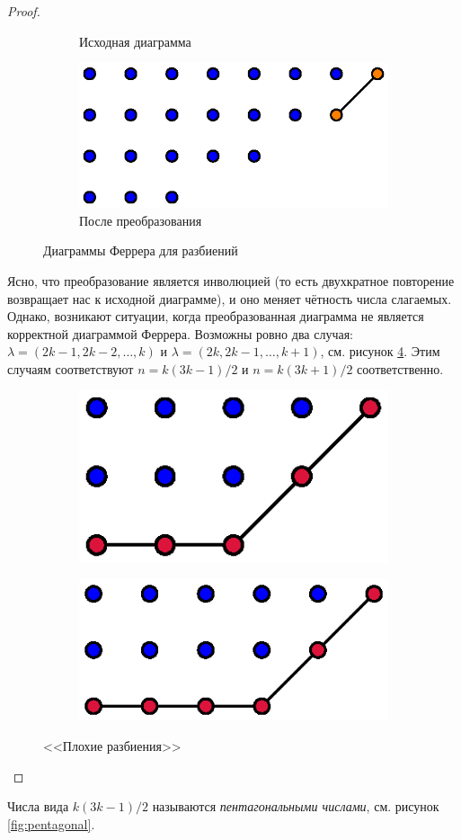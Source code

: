 \documentclass[a5paper]{article}
\theoremstyle{definition}
\begin{document}
\begin{proof}
\begin{figure}[h]
\begin{subfigure}{.33\textwidth}
	\caption{Исходная диаграмма}
	\label{fig:ferrer_2}	
\end{subfigure}
\begin{subfigure}{.33\textwidth}
	\centering
	\includegraphics[width=.8\textwidth]{ferrer_3}
	\caption{После преобразования}
	\label{fig:ferrer_3}	
\end{subfigure}
\caption{Диаграммы Феррера для разбиений}
\end{figure}
Ясно, что преобразование является инволюцией (то есть двухкратное 
повторение возвращает нас к исходной диаграмме), и оно меняет чётность 
числа слагаемых. Однако, возникают ситуации, когда преобразованная 
диаграмма не является корректной диаграммой Феррера. Возможны ровно два случая: 
\( \lambda = (2k-1, 2k-2, \ldots,k) \) и \( \lambda = (2k, 2k-1, \ldots, k+1) 
\), см. рисунок \ref{fig:ferrer_4}. Этим случаям соответствуют \( n = k(3k-1)/2 
\) и \( n = k(3k+1)/2 \) соответственно.
\begin{figure}[h]
\centering
\begin{subfigure}{.4\textwidth}
	\centering
	\includegraphics[width=.5\textwidth]{ferrer_4}
\end{subfigure}%
\begin{subfigure}{.4\textwidth}
	\centering
	\includegraphics[width=.6\textwidth]{ferrer_5}
\end{subfigure}
\caption{<<Плохие разбиения>>}
\label{fig:ferrer_4}	
\end{figure}
\end{proof}
Числа вида \( k(3k-1)/2 \) называются \textit{пентагональными числами}, см. 
рисунок \ref{fig:pentagonal}.
\end{document}

